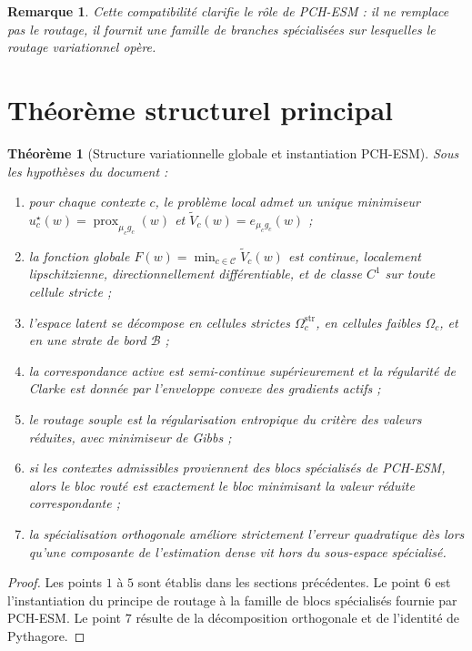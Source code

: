 \documentclass[11pt,a4paper]{article}
\newtheorem{theorem}{Théorème}[section]
\newtheorem{remark}{Remarque}[section]
\DeclareMathOperator{\prox}{prox}
\newcommand{\Ccal}{\mathcal C}
\newcommand{\Bcal}{\mathcal B}
\begin{document}
\begin{remark}
Cette compatibilité clarifie le rôle de PCH-ESM : il ne remplace pas le routage, il fournit une famille de branches spécialisées sur lesquelles le routage variationnel opère.
\end{remark}

\section{Théorème structurel principal}

\begin{theorem}[Structure variationnelle globale et instantiation PCH-ESM]
Sous les hypothèses du document :
\begin{enumerate}[leftmargin=2em]
\item pour chaque contexte \(c\), le problème local admet un unique minimiseur \(u_c^\star(w)=\prox_{\mu_c g_c}(w)\) et \(\widetilde V_c(w)=e_{\mu_c g_c}(w)\) ;
\item la fonction globale \(F(w)=\min_{c\in\Ccal}\widetilde V_c(w)\) est continue, localement lipschitzienne, directionnellement différentiable, et de classe \(C^1\) sur toute cellule stricte ;
\item l'espace latent se décompose en cellules strictes \(\Omega_c^{\mathrm{str}}\), en cellules faibles \(\Omega_c\), et en une strate de bord \(\Bcal\) ;
\item la correspondance active est semi-continue supérieurement et la régularité de Clarke est donnée par l'enveloppe convexe des gradients actifs ;
\item le routage souple est la régularisation entropique du critère des valeurs réduites, avec minimiseur de Gibbs ;
\item si les contextes admissibles proviennent des blocs spécialisés de PCH-ESM, alors le bloc routé est exactement le bloc minimisant la valeur réduite correspondante ;
\item la spécialisation orthogonale améliore strictement l'erreur quadratique dès lors qu'une composante de l'estimation dense vit hors du sous-espace spécialisé.
\end{enumerate}
\end{theorem}

\begin{proof}
Les points \(1\) à \(5\) sont établis dans les sections précédentes. Le point \(6\) est l'instantiation du principe de routage à la famille de blocs spécialisés fournie par PCH-ESM. Le point \(7\) résulte de la décomposition orthogonale et de l'identité de Pythagore.
\end{proof}
\end{document}
